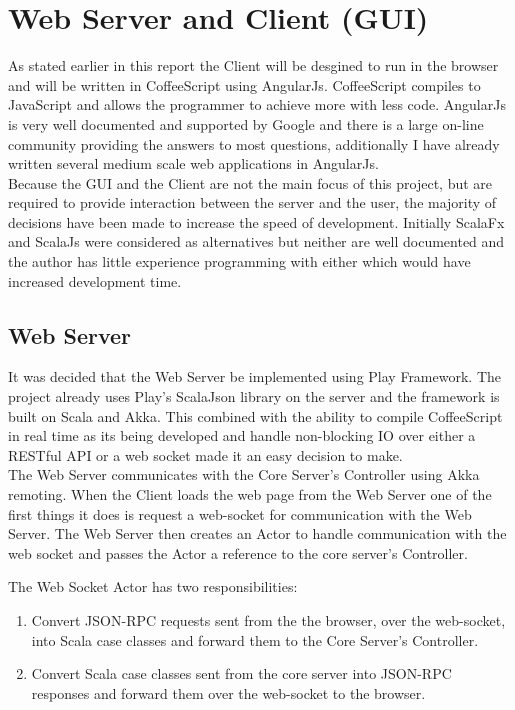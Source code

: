 \section{Web Server and Client (GUI)}

	As stated earlier in this report the Client will be desgined to run in the browser and will be written in CoffeeScript using AngularJs. CoffeeScript compiles to JavaScript and allows the programmer to achieve more with less code\cite{CoffeeScript}. AngularJs is very well documented and supported by Google and there is a large on-line community providing the answers to most questions, additionally I have already written several medium scale web applications in AngularJs.\\
	
	Because the GUI and the Client are not the main focus of this project, but are required to provide interaction between the server and the user, the majority of decisions have been made to increase the speed of development. Initially ScalaFx\cite{ScalaFx} and ScalaJs\cite{ScalaJs} were considered as alternatives but neither are well documented and the author has little experience programming with either which would have increased development time.\\
	
	\subsection{Web Server}
		It was decided that the Web Server be implemented using Play Framework\cite{PlayFramework}. The project already uses Play's ScalaJson library on the server and the framework is built on Scala and Akka. This combined with the ability to compile CoffeeScript in real time as its being developed and handle non-blocking IO over either a RESTful API or a web socket made it an easy decision to make.\\
		
		The Web Server communicates with the Core Server's Controller using Akka remoting\cite{AkkaRemoting}. When the Client loads the web page from the Web Server one of the first things it does is request a web-socket for communication with the Web Server. The Web Server then creates an Actor to handle communication with the web socket and passes the Actor a reference to the core server's Controller.\
		
		The Web Socket Actor has two responsibilities:
		
		\begin{enumerate}
			\item Convert JSON-RPC requests sent from the the browser, over the web-socket, into Scala case classes and forward them to the Core Server's Controller.
			\item Convert Scala case classes sent from the core server into JSON-RPC responses and forward them over the web-socket to the browser. 
		\end{enumerate}
		
